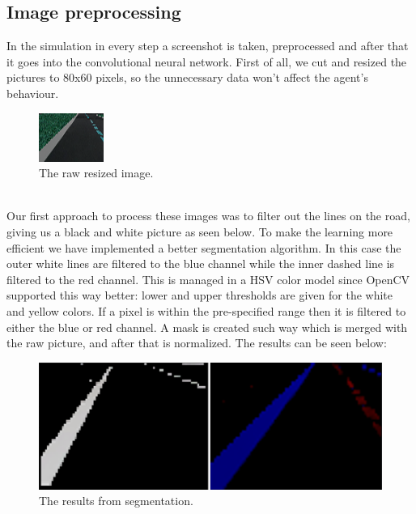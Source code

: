 \documentclass{article}
\begin{document}
\subsection{Image preprocessing}
In the simulation in every step a screenshot is taken, preprocessed and after that it goes
into the convolutional neural network. First of all, we cut and resized the
pictures to 80x60 pixels, so the unnecessary data won't affect the agent's behaviour.
\begin{figure}[h]
  \centering
  \includegraphics[scale=2]{fig2.png}
  \caption{The raw resized image.}
\end{figure}
\\
Our first approach to process these images was to
filter out the lines on the road, giving us a black and white picture as seen below.
To make the learning more efficient we have implemented a better segmentation algorithm.
In this case the outer white lines are filtered to the blue channel while the inner dashed
line is filtered to the red channel. This is managed in a HSV color model since OpenCV
supported this way better: lower and upper thresholds are given for the white and yellow
colors. If a pixel is within the pre-specified range then it is filtered to either the
blue or red channel. A mask is created such way which is merged with the raw picture,
and after that is normalized. The results can be seen below:
\begin{figure}[h]
  \centering
  \includegraphics[scale=0.3]{fig1.png}
  \caption{The results from segmentation.}
\end{figure}
\end{document}
